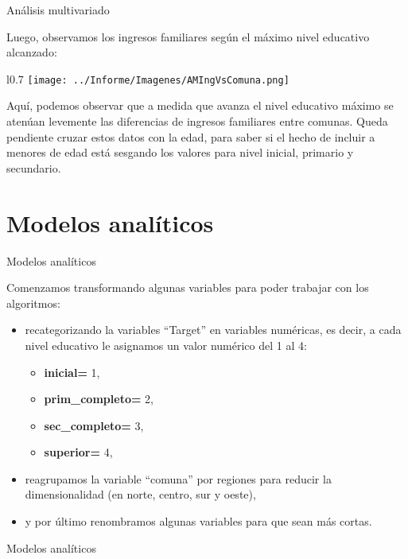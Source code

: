 \documentclass[pdf]{beamer}
\begin{document}
\begin{frame}{Análisis multivariado}
    \footnotesize

    Luego, observamos los ingresos familiares según el máximo nivel educativo alcanzado:
    \begin{wrapfigure}{l}{0.7\textwidth}
        \texttt{[image: ../Informe/Imagenes/AMIngVsComuna.png]}
    \end{wrapfigure}

    Aquí, podemos observar que a medida que avanza el nivel educativo máximo se atenúan levemente las diferencias de ingresos familiares entre comunas. Queda pendiente cruzar estos datos con la edad, para saber si el hecho de incluir a menores de edad está sesgando los valores para nivel inicial, primario y secundario.

\end{frame}

\section{Modelos analíticos}

\begin{frame}{Modelos analíticos}

    Comenzamos transformando algunas variables para poder trabajar con los algoritmos:
    \begin{itemize}
        \item recategorizando la variables ``Target'' en variables numéricas, es decir, a cada nivel educativo le asignamos un valor numérico del 1 al 4:
        \begin{itemize}
            \item \textbf{inicial=} 1,
            \item \textbf{prim\_completo=} 2,
            \item \textbf{sec\_completo=} 3,
            \item \textbf{superior=} 4,
        \end{itemize}
        \item reagrupamos la variable ``comuna'' por regiones para reducir la dimensionalidad (en norte, centro, sur y oeste),
        \item y por último renombramos algunas variables para que sean más cortas.
    \end{itemize}
    
\end{frame}


\begin{frame}{Modelos analíticos}

\end{frame}
\end{document}

